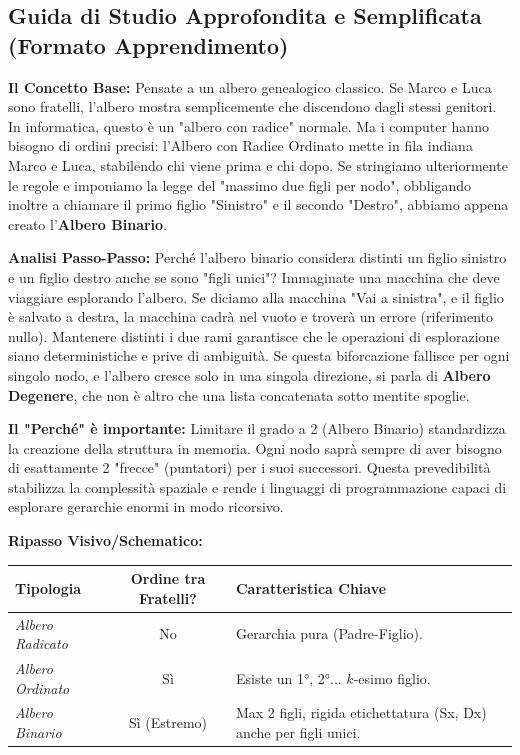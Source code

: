 \documentclass[a4paper, 11pt]{report}
\begin{document}
\vspace{0.5cm}
\subsection*{Guida di Studio Approfondita e Semplificata (Formato Apprendimento)}



\textbf{Il Concetto Base:}
Pensate a un albero genealogico classico. Se Marco e Luca sono fratelli, l'albero mostra semplicemente che discendono dagli stessi genitori. In informatica, questo è un "albero con radice" normale. Ma i computer hanno bisogno di ordini precisi: l'Albero con Radice Ordinato mette in fila indiana Marco e Luca, stabilendo chi viene prima e chi dopo.
Se stringiamo ulteriormente le regole e imponiamo la legge del "massimo due figli per nodo", obbligando inoltre a chiamare il primo figlio "Sinistro" e il secondo "Destro", abbiamo appena creato l'\textbf{Albero Binario}.

\textbf{Analisi Passo-Passo:}
Perché l'albero binario considera distinti un figlio sinistro e un figlio destro anche se sono "figli unici"?
Immaginate una macchina che deve viaggiare esplorando l'albero. Se diciamo alla macchina "Vai a sinistra", e il figlio è salvato a destra, la macchina cadrà nel vuoto e troverà un errore (riferimento nullo). Mantenere distinti i due rami garantisce che le operazioni di esplorazione siano deterministiche e prive di ambiguità.
Se questa biforcazione fallisce per ogni singolo nodo, e l'albero cresce solo in una singola direzione, si parla di \textbf{Albero Degenere}, che non è altro che una lista concatenata sotto mentite spoglie.

\textbf{Il "Perché" è importante:}
Limitare il grado a 2 (Albero Binario) standardizza la creazione della struttura in memoria. Ogni nodo saprà sempre di aver bisogno di esattamente 2 "frecce" (puntatori) per i suoi successori. Questa prevedibilità stabilizza la complessità spaziale e rende i linguaggi di programmazione capaci di esplorare gerarchie enormi in modo ricorsivo.

\textbf{Ripasso Visivo/Schematico:}
\begin{center}
\begin{tabular}{|l|c|p{6cm}|}
\hline
\textbf{Tipologia} & \textbf{Ordine tra Fratelli?} & \textbf{Caratteristica Chiave} \\
\hline
\textit{Albero Radicato} & No & Gerarchia pura (Padre-Figlio). \\
\hline
\textit{Albero Ordinato} & Sì & Esiste un 1°, 2°... $k$-esimo figlio. \\
\hline
\textit{Albero Binario} & Sì (Estremo) & Max 2 figli, rigida etichettatura (Sx, Dx) anche per figli unici. \\
\hline
\end{tabular}
\end{center}
\end{document}

